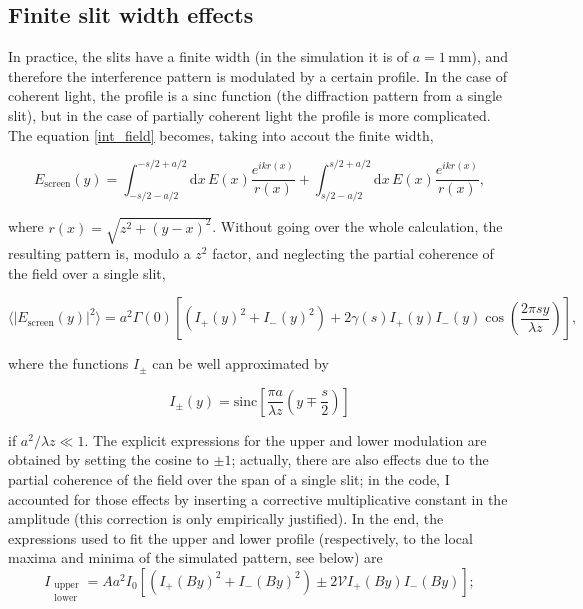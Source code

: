 \subsection{Finite slit width effects}

In practice, the slits have a finite width (in the simulation it is of $a = 1 \, \mathrm{mm}$), and therefore the interference pattern is modulated by a certain 
profile. In the case of coherent light, the profile is a $\mathrm{sinc}$ function (the diffraction pattern from a single slit), but in the case of partially 
coherent light the profile is more complicated. The equation \eqref{int_field} becomes, taking into accout the finite width,

\begin{equation}
    E_{\text{screen}}(y) = \int_{-s/2-a/2}^{-s/2 + a/2} \mathrm dx \, E(x)\frac{e^{ikr(x)}}{r(x)} + \int_{s/2-a/2}^{s/2 + a/2} \mathrm dx \, E(x)\frac{e^{ikr(x)}}{r(x)},
\end{equation}

where $r(x) = \sqrt{z^2 + (y - x)^2}$. Without going over the whole calculation, the resulting pattern is, modulo a $z^2$ factor, and 
neglecting the partial coherence of the field over a single slit,

\begin{equation}\label{theopatt}
    \langle |E_{\text{screen}}(y)|^2 \rangle =  a^2\Gamma(0) \left[ \left( I_+(y)^2 + I_-(y)^2 \right) + 2\gamma(s)I_+(y)I_-(y)\cos\left( \frac{2\pi sy}{\lambda z} \right)\right],
\end{equation}

where the functions $I_{\pm}$ can be well approximated by

\begin{equation}
    I_\pm(y) = \mathrm{sinc}\left[ \frac{\pi a}{\lambda z} \left( y \mp \frac s2 \right)\right]
\end{equation}

if $a^2/\lambda z \ll 1$. The explicit expressions for the upper and lower modulation are obtained by setting the cosine to $\pm 1$; actually, there are also effects due to the partial coherence of the field over the span of a single slit; in the code, I accounted for those effects by 
inserting a corrective multiplicative constant in the amplitude (this correction is only empirically justified). In the end, the expressions used to fit the upper and 
lower profile (respectively, to the local maxima and minima of the simulated pattern, see below) are 
\begin{equation}
    I_{\substack{\text{upper} \\ \text{lower}}} = A a^2 I_0 \left[ \left( I_+(By)^2 + I_-(By)^2 \right) \pm 2 \mathcal V I_+(By)I_-(By)\right];
\end{equation}

